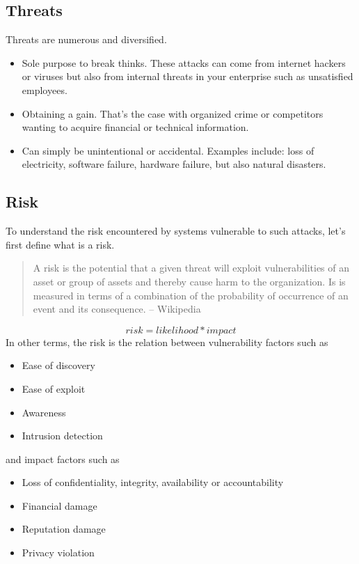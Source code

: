 \subsection{Threats}

Threats are numerous and diversified.
\begin{itemize}
\item Sole purpose to break thinks.
	These attacks can come from internet hackers or viruses but also from
	internal threats in your enterprise such as unsatisfied employees.
\item Obtaining a gain.
	That's the case with organized crime or competitors wanting
	to acquire financial or technical information.
\item Can simply be unintentional or accidental.
	Examples include: loss of electricity, software failure, hardware
	failure, but also natural disasters.
\end{itemize}

\subsection{Risk}

To understand the risk encountered by systems vulnerable to such attacks, let's
first define what is a risk.

\begin{quote}
A risk is the potential that a given threat will
exploit vulnerabilities of an asset or group of assets and thereby cause harm to
the organization. Is is measured in terms of a combination of the probability of
occurrence of an event and its consequence.
-- Wikipedia
\end{quote}
\[
   risk = likelihood * impact
\]
In other terms, the risk is the relation between vulnerability factors such as 
\begin{itemize}
\item Ease of discovery
\item Ease of exploit
\item Awareness
\item Intrusion detection
\end{itemize}
and impact factors such as
\begin{itemize}
\item Loss of confidentiality, integrity, availability or accountability
\item Financial damage
\item Reputation damage
\item Privacy violation
\end{itemize}

